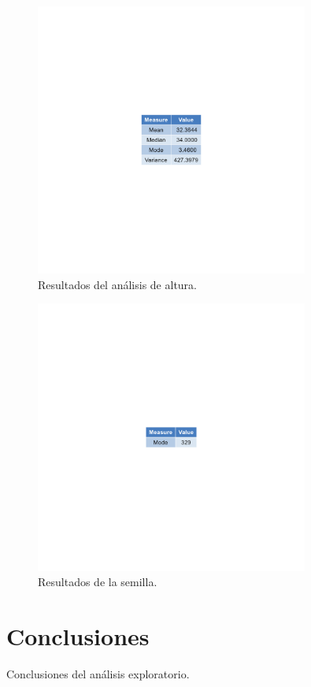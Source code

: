 \documentclass{article}
\begin{document}
\begin{figure}[htbp]
    \centering
    \includegraphics[width=0.8\textwidth]{height_resultados.png}
    \caption{Resultados del análisis de altura.}
\end{figure}


\begin{figure}[htbp]
    \centering
    \includegraphics[width=0.8\textwidth]{seed_resultados.png}
    \caption{Resultados de la semilla.}
\end{figure}


\section*{Conclusiones}
Conclusiones del análisis exploratorio.
\end{document}
